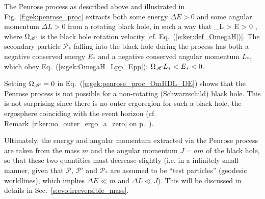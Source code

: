 \begin{prop}
The Penrose process as described above and illustrated in Fig.~\ref{f:gek:penrose_proc}
extracts both some energy $\Delta E > 0$  and some angular momentum $\Delta L > 0$ from
a rotating black hole, in such a way that
\be \label{e:gek:penrose_proc_OmHDL_DE}
    \Omega_{\Hor}\Delta L > \Delta E > 0 ,
\ee
where $\Omega_{\mathscr{H}}$ is the black hole rotation velocity [cf. Eq.~(\ref{e:ker:def_OmegaH})].
The secondary particle $\mathscr{P}_*$ falling into the black hole during the
process has both a negative conserved energy $E_*$ and a negative conserved angular
momentum $L_*$, which obey Eq.~(\ref{e:gek:OmegaH_Lpp_Epp}):
$\Omega_{\mathscr{H}} L_* < E_* < 0$.
\end{prop}

\begin{remark}
Setting $\Omega_{\mathscr{H}} = 0$ in Eq.~(\ref{e:gek:penrose_proc_OmHDL_DE}) shows
that the Penrose process is not possible for a non-rotating (Schwarzschild) black hole.
This is not surprising since there is no outer ergoregion for such a black hole, the
ergosphere coinciding with the event horizon (cf. Remark~\ref{r:ker:no_outer_ergo_a_zero} on
p.~\pageref{r:ker:no_outer_ergo_a_zero}).
\end{remark}

Ultimately, the energy and angular momentum extracted via the Penrose process
are taken from the mass $m$ and the angular momentum $J = am$
of the black hole, so that these two quantities must decrease slightly
(i.e. in a infinitely small manner, given that $\mathscr{P}$, $\mathscr{P}'$
and $\mathscr{P}_*$ are assumed to be ``test particles'' (geodesic worldlines),
which implies $\Delta E \ll m$ and $\Delta L \ll J$).
This will be discussed in details in Sec.~\ref{s:evo:irreversible_mass}.

